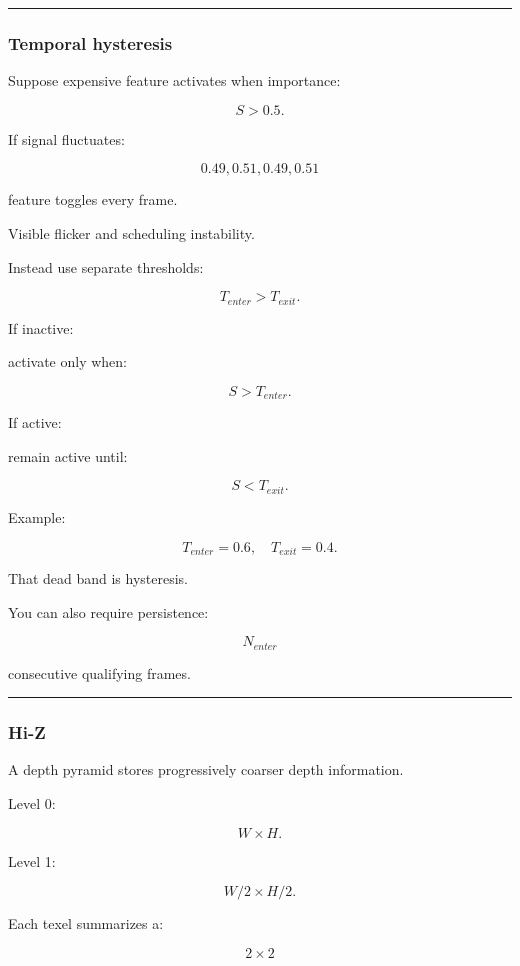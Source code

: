 \begin{center}\rule{0.5\linewidth}{0.5pt}\end{center}

\subsubsection{Temporal hysteresis}\label{temporal-hysteresis}

Suppose expensive feature activates when importance:

\[
S>0.5.
\]

If signal fluctuates:

\[
0.49,0.51,0.49,0.51
\]

feature toggles every frame.

Visible flicker and scheduling instability.

Instead use separate thresholds:

\[
\boxed{
T_{enter}>T_{exit}.
}
\]

If inactive:

activate only when:

\[
S>T_{enter}.
\]

If active:

remain active until:

\[
S<T_{exit}.
\]

Example:

\[
T_{enter}=0.6,
\quad
T_{exit}=0.4.
\]

That dead band is hysteresis.

You can also require persistence:

\[
N_{enter}
\]

consecutive qualifying frames.

\begin{center}\rule{0.5\linewidth}{0.5pt}\end{center}

\subsubsection{Hi-Z}\label{hi-z}

A depth pyramid stores progressively coarser depth information.

Level 0:

\[
W\times H.
\]

Level 1:

\[
W/2\times H/2.
\]

Each texel summarizes a:

\[
2\times2
\]

